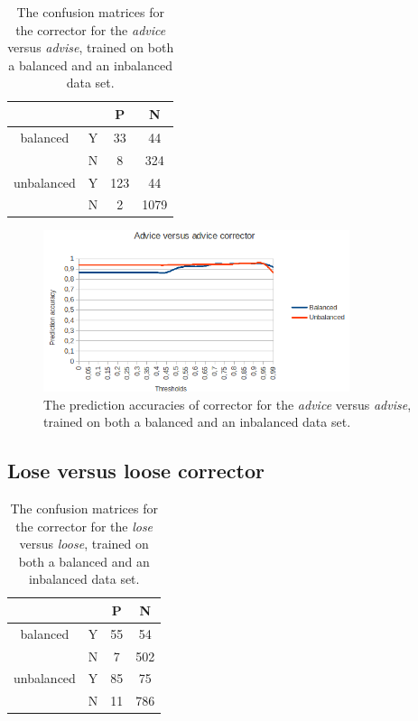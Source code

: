 \documentclass[12pt]{article}
\begin{document}
\begin{table}[H] \footnotesize
\centering
\begin{tabular}{|c|c|c|c|}
\hline
&&P&N\\
\hline
balanced&Y&33&44\\
&N&8&324\\
\hline
\hline
unbalanced&Y&123&44\\
&N&2&1079\\
\hline
\end{tabular}
\caption{The confusion matrices for the corrector for the \emph{advice} versus \emph{advise}, trained on both a balanced and an inbalanced data set.}
\end{table}

\begin{figure}[H]
\centering
\includegraphics[width=0.8\textwidth]{accuracy_adviceadvise.png}
\caption{The prediction accuracies of corrector for the \emph{advice} versus \emph{advise}, trained on both a balanced and an inbalanced data set.}
\end{figure}

\subsection{Lose versus loose corrector}

\begin{table}[H] \footnotesize
\centering
\begin{tabular}{|c|c|c|c|}
\hline
&&P&N\\
\hline
balanced&Y&55&54\\
&N&7&502\\
\hline
\hline
unbalanced&Y&85&75\\
&N&11&786\\
\hline
\end{tabular}
\caption{The confusion matrices for the corrector for the \emph{lose} versus \emph{loose}, trained on both a balanced and an inbalanced data set.}
\end{table}
\end{document}
